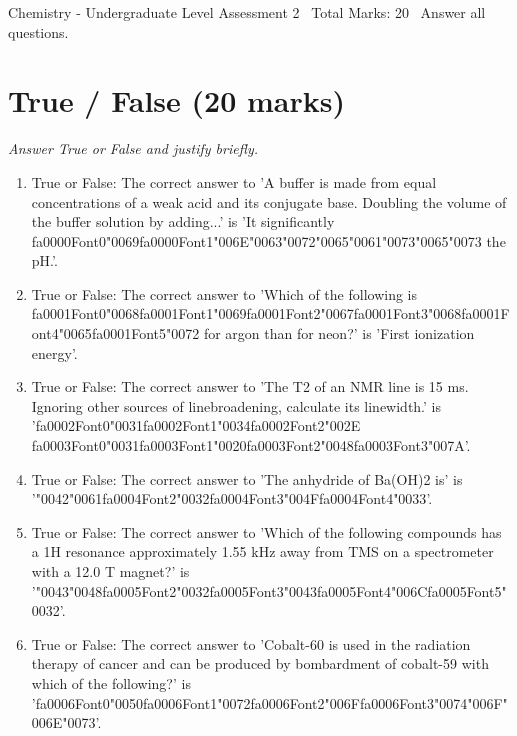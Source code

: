 \documentclass[12pt]{article}
\begin{document}
\begin{center}
Chemistry - Undergraduate Level Assessment 2 \
Total Marks: 20 \
Answer all questions.
\end{center}

\section*{True / False (20 marks)}
\textit{Answer True or False and justify briefly.}
\begin{enumerate}[label=\arabic*.]
\item True or False: The correct answer to 'A buffer is made from equal concentrations of a weak acid and its conjugate base. Doubling the volume of the buffer solution by adding...' is 'It significantly {\csname fa0000Font0\endcsname\char"0069}{\csname fa0000Font1\endcsname\char"006E}{\char"0063}{\char"0072}{\char"0065}{\char"0061}{\char"0073}{\char"0065}{\char"0073} the pH.'.
\item True or False: The correct answer to 'Which of the following is {\csname fa0001Font0\endcsname\char"0068}{\csname fa0001Font1\endcsname\char"0069}{\csname fa0001Font2\endcsname\char"0067}{\csname fa0001Font3\endcsname\char"0068}{\csname fa0001Font4\endcsname\char"0065}{\csname fa0001Font5\endcsname\char"0072} for argon than for neon?' is 'First ionization energy'.
\item True or False: The correct answer to 'The T2 of an NMR line is 15 ms. Ignoring other sources of linebroadening, calculate its linewidth.' is '{\csname fa0002Font0\endcsname\char"0031}{\csname fa0002Font1\endcsname\char"0034}{\csname fa0002Font2\endcsname\char"002E} {\csname fa0003Font0\endcsname\char"0031}{\csname fa0003Font1\endcsname\char"0020}{\csname fa0003Font2\endcsname\char"0048}{\csname fa0003Font3\endcsname\char"007A}'.
\item True or False: The correct answer to 'The anhydride of Ba(OH)2 is' is '{\char"0042}{\char"0061}{\csname fa0004Font2\endcsname\char"0032}{\csname fa0004Font3\endcsname\char"004F}{\csname fa0004Font4\endcsname\char"0033}'.
\item True or False: The correct answer to 'Which of the following compounds has a 1H resonance approximately 1.55 kHz away from TMS on a spectrometer with a 12.0 T magnet?' is '{\char"0043}{\char"0048}{\csname fa0005Font2\endcsname\char"0032}{\csname fa0005Font3\endcsname\char"0043}{\csname fa0005Font4\endcsname\char"006C}{\csname fa0005Font5\endcsname\char"0032}'.
\item True or False: The correct answer to 'Cobalt-60 is used in the radiation therapy of cancer and can be produced by bombardment of cobalt-59 with which of the following?' is '{\csname fa0006Font0\endcsname\char"0050}{\csname fa0006Font1\endcsname\char"0072}{\csname fa0006Font2\endcsname\char"006F}{\csname fa0006Font3\endcsname\char"0074}{\char"006F}{\char"006E}{\char"0073}'.

\end{enumerate}
\end{document}
